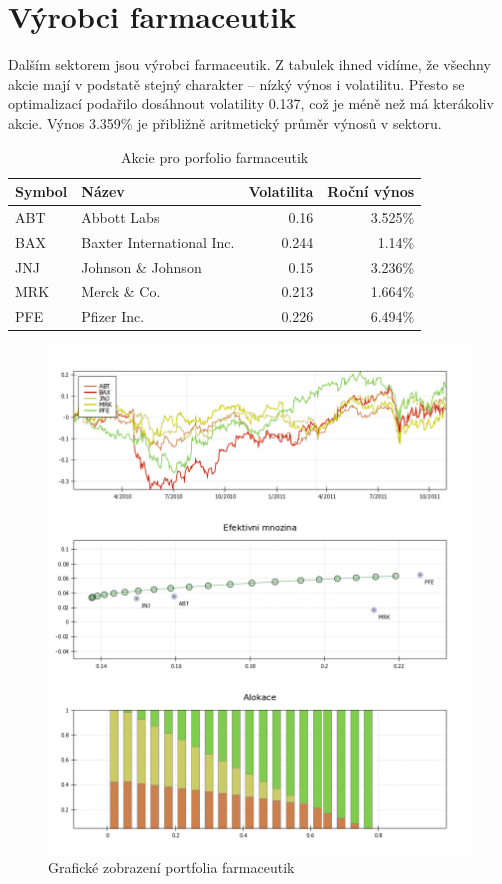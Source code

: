 \documentclass[a4paper,12pt]{report}
\begin{document}
  \section{Výrobci farmaceutik}
    Dalším sektorem jsou výrobci farmaceutik. Z tabulek ihned vidíme, že všechny akcie mají v podstatě stejný charakter -- nízký výnos i volatilitu. Přesto se optimalizací podařilo dosáhnout volatility 0.137, což je méně než má kterákoliv akcie. Výnos 3.359\% je přibližně aritmetický průměr výnosů v sektoru.
    
    \begin{table}[htb]
      \centering
      \begin{tabular}{|l|l|r|r|}
        \hline
        Symbol&Název&Volatilita&Roční výnos\\\hline\hline
        ABT&Abbott Labs &0.16&3.525\%\\\hline
        BAX&Baxter International Inc. &0.244&1.14\%\\\hline
        JNJ&Johnson \& Johnson &0.15&3.236\%\\\hline
        MRK&Merck \& Co. &0.213&1.664\%\\\hline
        PFE&Pfizer Inc. &0.226&6.494\%\\\hline
      \end{tabular}
      \caption{Akcie pro porfolio farmaceutik}
    \end{table}

    \begin{figure}[htb]
      \centering
        \includegraphics[height=0.95\textheight]{drugs1.png}
       \caption{Grafické zobrazení portfolia farmaceutik}
    \end{figure}
\end{document}

